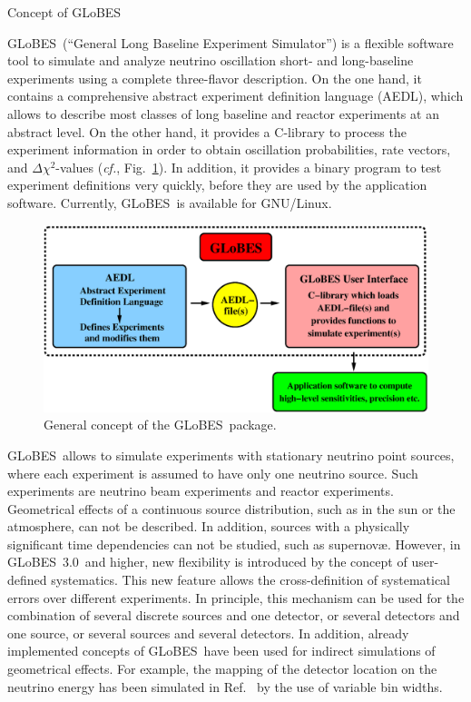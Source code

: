 \documentclass[12pt,a4paper]{article}
\makeatletter
\newcommand{\capdef}{}
\newcommand{\mycaption}[2][\capdef]{\renewcommand{\capdef}{#2}%
       \caption[#1]{{\footnotesize #2}}}
\renewcommand{\section}{\@startsection{section}{1}{0em}{-\baselineskip}%
{\baselineskip}{\normalfont\large\bfseries}}
\newcommand{\cf}{{\it cf.}}
\newcommand{\fig}{Fig.}
\newcommand{\Ref}{Ref.}
\newcommand{\GLOBES}{{\sf GLoBES}}
\newcommand{\GLOBESN}{{\sf GLoBES~3.0}}
\newcommand{\AEDL}{{\sf AEDL}}
\newcommand{\figu}[1]{\fig~\ref{fig:#1}}
\makeatother
\begin{document}
\section{Concept of \GLOBES }

\GLOBES\ (``General Long Baseline Experiment Simulator'') is a flexible
software tool to simulate and analyze neutrino oscillation 
short- and long-baseline experiments using a 
complete three-flavor description. On the
one hand, it contains a comprehensive abstract experiment definition
language (\AEDL ), which allows to describe 
most classes of long baseline and reactor experiments
at an abstract level. On the other hand, it provides a C-library to 
process the experiment information in order to obtain oscillation
probabilities, rate vectors, and $\Delta \chi^2$-values (\cf, \figu{GLOBES}). 
In addition, it provides a binary program to test experiment
definitions very quickly, before they are used by the application software.
Currently, \GLOBES\ is available for GNU/Linux. 

\begin{figure}[t]
\begin{center}
\includegraphics[width=14cm]{GLOBES}
\end{center}
\mycaption{\label{fig:GLOBES} General concept of the \GLOBES\ package.}
\end{figure}

\GLOBES\ allows to simulate experiments with stationary neutrino point 
sources, where each experiment is assumed to have only one neutrino source.
Such experiments are neutrino beam experiments and reactor experiments. 
Geometrical effects of a continuous source distribution, such as in the sun or the 
atmosphere, can not be described. In addition, sources with a physically 
significant time dependencies can not be studied, such as  supernov\ae. 
However, in \GLOBESN\ and higher, new flexibility is introduced by the
concept of user-defined systematics. This new feature allows the cross-definition
of systematical errors over different experiments. In principle, 
this mechanism can be used for the combination of several discrete sources
and one detector, or several detectors and one source, or several sources and
several detectors. In addition, already implemented
concepts of \GLOBES\ have been used for indirect simulations of geometrical
effects. For example, the mapping of the detector location on the neutrino
energy has been simulated in \Ref~\cite{Rolinec:2006xr} by the use of
variable bin widths.
\end{document}
